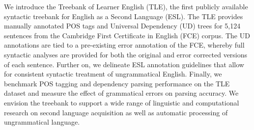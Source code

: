 We introduce the Treebank of Learner English (TLE), the first publicly available syntactic treebank for English as a Second Language (ESL). The TLE provides manually annotated POS tags and Universal Dependency (UD) trees for 5,124 sentences from the Cambridge First Certificate in English (FCE) corpus. The UD annotations are tied to a pre-existing error annotation of the FCE, whereby full syntactic analyses are provided for both the original and error corrected versions of each sentence. Further on, we delineate ESL annotation guidelines that allow for consistent syntactic treatment of ungrammatical English. Finally, we benchmark POS tagging and dependency parsing performance on the TLE dataset and measure the effect of grammatical errors on parsing accuracy. We envision the treebank to support a wide range of linguistic and computational research on second language acquisition as well as automatic processing of ungrammatical language.
